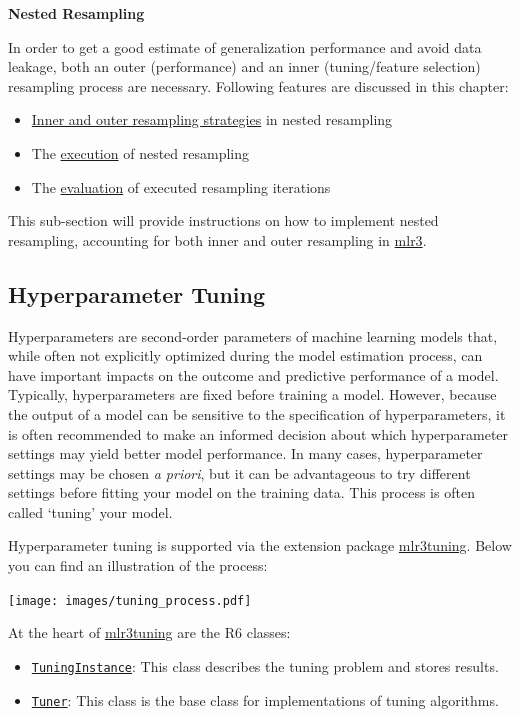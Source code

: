\documentclass[]{article}
\providecommand{\tightlist}{%
  \setlength{\itemsep}{0pt}\setlength{\parskip}{0pt}}
\begin{document}
\textbf{Nested Resampling}

In order to get a good estimate of generalization performance and avoid data leakage, both an outer (performance) and an inner (tuning/feature selection) resampling process are necessary.
Following features are discussed in this chapter:

\begin{itemize}
\tightlist
\item
  \protect\hyperlink{nested-resampling}{Inner and outer resampling strategies} in nested resampling
\item
  The \protect\hyperlink{nested-resamp-exec}{execution} of nested resampling
\item
  The \protect\hyperlink{nested-resamp-eval}{evaluation} of executed resampling iterations
\end{itemize}

This sub-section will provide instructions on how to implement nested resampling, accounting for both inner and outer resampling in \href{https://mlr3.mlr-org.com}{mlr3}.

\hypertarget{tuning}{%
\subsection{Hyperparameter Tuning}\label{tuning}}

Hyperparameters are second-order parameters of machine learning models that, while often not explicitly optimized during the model estimation process, can have important impacts on the outcome and predictive performance of a model.
Typically, hyperparameters are fixed before training a model.
However, because the output of a model can be sensitive to the specification of hyperparameters, it is often recommended to make an informed decision about which hyperparameter settings may yield better model performance.
In many cases, hyperparameter settings may be chosen \emph{a priori}, but it can be advantageous to try different settings before fitting your model on the training data.
This process is often called `tuning' your model.

Hyperparameter tuning is supported via the extension package \href{https://mlr3tuning.mlr-org.com}{mlr3tuning}.
Below you can find an illustration of the process:

\texttt{[image: images/tuning\_process.pdf]}

At the heart of \href{https://mlr3tuning.mlr-org.com}{mlr3tuning} are the R6 classes:

\begin{itemize}
\tightlist
\item
  \href{https://mlr3tuning.mlr-org.com/reference/TuningInstance.html}{\texttt{TuningInstance}}: This class describes the tuning problem and stores results.
\item
  \href{https://mlr3tuning.mlr-org.com/reference/Tuner.html}{\texttt{Tuner}}: This class is the base class for implementations of tuning algorithms.
\end{itemize}
\end{document}
